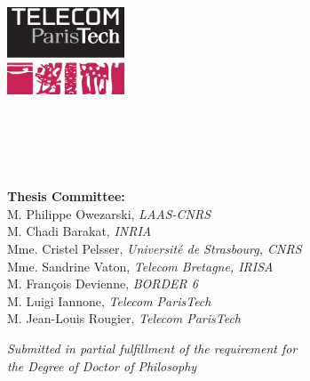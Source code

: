 \begin{titlepage}
    \begin{addmargin}[-1cm]{-3cm}
    \begin{center}
		\large
        \hfill

        \vfill

        \begingroup
            \LARGE \color{Maroon}\spacedallcaps{\myTitle} \\ \bigskip 
            \mySubtitle \\ \bigskip
        \endgroup
        
		\vfill  		
  		
		\includegraphics[width=3.5cm]{gfx/telecom.eps} \\ \bigskip
        
        \vfill
        
        {\Large \spacedlowsmallcaps{\myName}}\\ \medskip           
        
        \myDepartment \\                            
        \myUni \\ \bigskip
          
        \vfill

		{\large \textbf{Thesis Committee:}}\\
		M. Philippe Owezarski, \textit{LAAS-CNRS} \\
		M. Chadi Barakat, \textit{INRIA} \\
		Mme. Cristel Pelsser, \textit{Université de Strasbourg, CNRS}\\
		Mme. Sandrine Vaton, \textit{Telecom Bretagne, IRISA}\\
		M. François Devienne, \textit{BORDER 6}\\
		M. Luigi Iannone, \textit{Telecom ParisTech}\\
		M. Jean-Louis Rougier, \textit{Telecom ParisTech}\\
		
		\vfill      
        
        {\normalsize \textit{Submitted in partial fulfillment of the requirement for\\
        the Degree of Doctor of Philosophy}}
        \vfill
    \end{center}
 
  \end{addmargin}       
\end{titlepage}   